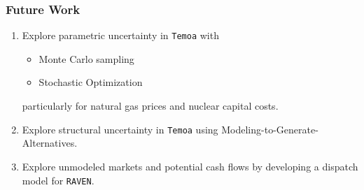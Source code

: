 \begin{frame}
  \frametitle{Future Work}
  \begin{enumerate}
    \item Explore parametric uncertainty in \texttt{Temoa} with
    \begin{itemize}
      \item Monte Carlo sampling
      \item Stochastic Optimization
    \end{itemize}
    particularly for natural gas prices and nuclear capital costs.
    \item Explore structural uncertainty in \texttt{Temoa} using Modeling-to-Generate-Alternatives.
    \item Explore unmodeled markets and potential cash flows by developing a dispatch
    model for \texttt{RAVEN}.
  \end{enumerate}
\end{frame}
